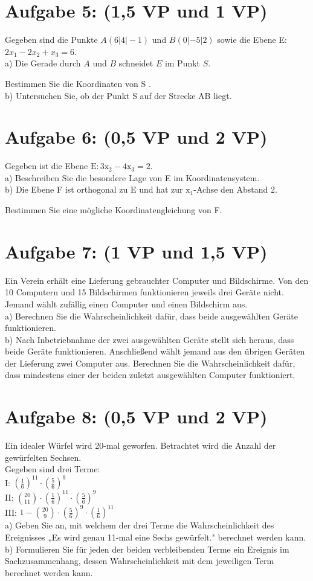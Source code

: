 \documentclass[10pt]{article}
\begin{document}
\section*{Aufgabe 5: (1,5 VP und 1 VP)}
Gegeben sind die Punkte $A(6|4|-1)$ und $B(0|-5| 2)$ sowie die Ebene E: $2 x_{1}-2 x_{2}+x_{3}=6$.\\
a) Die Gerade durch $A$ und $B$ schneidet $E$ im Punkt $S$.

Bestimmen Sie die Koordinaten von S .\\
b) Untersuchen Sie, ob der Punkt S auf der Strecke AB liegt.

\section*{Aufgabe 6: (0,5 VP und 2 VP)}
Gegeben ist die Ebene $\mathrm{E}: 3 \mathrm{x}_{2}-4 \mathrm{x}_{3}=2$.\\
a) Beschreiben Sie die besondere Lage von E im Koordinatensystem.\\
b) Die Ebene F ist orthogonal zu E und hat zur $\mathrm{x}_{1}$-Achse den Abstand 2.

Bestimmen Sie eine mögliche Koordinatengleichung von F.

\section*{Aufgabe 7: (1 VP und 1,5 VP)}
Ein Verein erhält eine Lieferung gebrauchter Computer und Bildschirme. Von den 10 Computern und 15 Bildschirmen funktionieren jeweils drei Geräte nicht. Jemand wählt zufällig einen Computer und einen Bildschirm aus.\\
a) Berechnen Sie die Wahrscheinlichkeit dafür, dass beide ausgewählten Geräte funktionieren.\\
b) Nach Inbetriebnahme der zwei ausgewählten Geräte stellt sich heraus, dass beide Geräte funktionieren. Anschließend wählt jemand aus den übrigen Geräten der Lieferung zwei Computer aus. Berechnen Sie die Wahrscheinlichkeit dafür, dass mindestens einer der beiden zuletzt ausgewählten Computer funktioniert.

\section*{Aufgabe 8: (0,5 VP und 2 VP)}
Ein idealer Würfel wird 20-mal geworfen. Betrachtet wird die Anzahl der gewürfelten Sechsen.\\
Gegeben sind drei Terme:\\
I: $\left(\frac{1}{6}\right)^{11} \cdot\left(\frac{5}{6}\right)^{9}$\\
II: $\binom{20}{11} \cdot\left(\frac{1}{6}\right)^{11} \cdot\left(\frac{5}{6}\right)^{9}$\\
III: $1-\binom{20}{9} \cdot\left(\frac{5}{6}\right)^{9} \cdot\left(\frac{1}{6}\right)^{11}$\\
a) Geben Sie an, mit welchem der drei Terme die Wahrscheinlichkeit des Ereignisses „Es wird genau 11-mal eine Sechs gewürfelt." berechnet werden kann.\\
b) Formulieren Sie für jeden der beiden verbleibenden Terme ein Ereignis im Sachzusammenhang, dessen Wahrscheinlichkeit mit dem jeweiligen Term berechnet werden kann.
\end{document}
